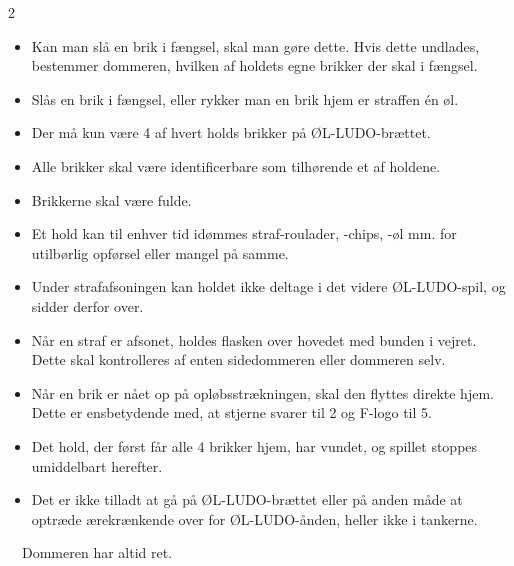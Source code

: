 \begin{multicols}{2}
    \begin{itemize}
		\item Kan man slå en brik i fængsel, skal man gøre dette. Hvis dette undlades, bestemmer dommeren, hvilken af holdets egne brikker der skal i fængsel.
		\item Slås en brik i fængsel, eller rykker man en brik hjem er straffen én øl.
		\item Der må kun være 4 af hvert holds brikker på ØL-LUDO-brættet.
		\item Alle brikker skal være identificerbare som tilhørende et af holdene.
		\item Brikkerne skal være fulde.
		\item Et hold kan til enhver tid idømmes straf-roulader, -chips, -øl mm. for utilbørlig opførsel eller mangel på samme.
		\item Under strafafsoningen kan holdet ikke deltage i det videre ØL-LUDO-spil, og sidder derfor over.
		\item Når en straf er afsonet, holdes flasken over hovedet med bunden i vejret. Dette skal kontrolleres af enten sidedommeren eller dommeren selv.
		\item Når en brik er nået op på opløbsstrækningen, skal den flyttes direkte hjem. Dette er ensbetydende med, at stjerne svarer til 2 og F-logo til 5.
		\item Det hold, der først får alle 4 brikker hjem, har vundet, og spillet stoppes umiddelbart herefter.
		\item Det er ikke tilladt at gå på ØL-LUDO-brættet eller på anden måde at optræde ærekrænkende over for ØL-LUDO-ånden, heller ikke i tankerne.
    \end{itemize}
\end{multicols}

\begin{center}
		\textbullet\ \ Dommeren har altid ret.
\end{center}

\vfill
{}
\vfill
